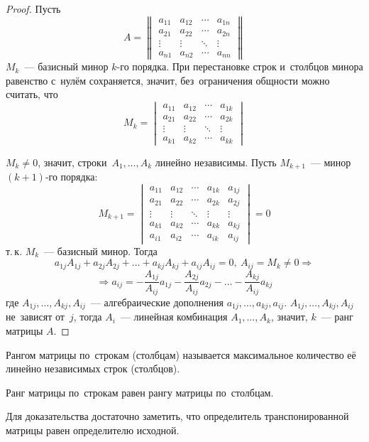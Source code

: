 \begin{proof}
Пусть
\begin{equation*}
A =
\begin{Vmatrix}
a_{11} & a_{12} & \cdots & a_{1n} \\
a_{21} & a_{22} & \cdots & a_{2n} \\
\vdots & \vdots & \ddots & \vdots \\
a_{n1} & a_{n2} & \cdots & a_{nn}
\end{Vmatrix}
\end{equation*}
$M_k$~--- базисный минор $k$\nobreakdash-го порядка.
При перестановке строк и~столбцов минора равенство с~нулём сохраняется, значит, без~ограничения общности можно считать, что
\begin{equation*}
M_k =
\begin{vmatrix}
a_{11} & a_{12} & \cdots & a_{1k} \\
a_{21} & a_{22} & \cdots & a_{2k} \\
\vdots & \vdots & \ddots & \vdots \\
a_{k1} & a_{k2} & \cdots & a_{kk}
\end{vmatrix}
\end{equation*}

$M_k \neq 0$, значит, строки~$A_1, \ldots, A_k$ линейно независимы. Пусть $M_{k+1}$~--- минор $(k + 1)$\nobreakdash-го порядка:
\begin{equation*}
M_{k+1} =
\begin{vmatrix}
a_{11} & a_{12} & \cdots & a_{1k} & a_{1j} \\
a_{21} & a_{22} & \cdots & a_{2k} & a_{2j} \\
\vdots & \vdots & \ddots & \vdots & \vdots \\
a_{k1} & a_{k2} & \cdots & a_{kk} & a_{kj} \\
a_{i1} & a_{i2} & \cdots & a_{ik} & a_{ij}
\end{vmatrix} = 0
\end{equation*}
т.\,к. $M_k$~--- базисный минор.
Тогда
\begin{equation*}
a_{1j} A_{1j} + a_{2j} A_{2j} + \ldots + a_{kj} A_{kj} + a_{ij} A_{ij} = 0, \ A_{ij} = M_k \neq 0 \Rightarrow
\end{equation*}
\begin{equation*}
\Rightarrow a_{ij} = -\frac{A_{1j}}{A_{ij}} a_{1j} - \frac{A_{2j}}{A_{ij}} a_{2j} - \ldots - \frac{A_{kj}}{A_{ij}} a_{kj}
\end{equation*}
где $A_{1j}, \ldots, A_{kj}, A_{ij}$~--- алгебраические дополнения $a_{1j}, \ldots, a_{kj}, a_{ij}$.
$A_{1j}, \ldots, A_{kj}, A_{ij}$ не~зависят от~$j$, тогда $A_i$~--- линейная комбинация $A_1, \ldots, A_k$, значит, $k$~--- ранг матрицы $A$.
\end{proof}

Рангом матрицы по~строкам (столбцам) называется максимальное количество её линейно независимых строк (столбцов).

\begin{consequent}
Ранг матрицы по~строкам равен рангу матрицы по~столбцам.
\end{consequent}%
Для доказательства достаточно заметить, что определитель транспонированной матрицы равен определителю исходной.